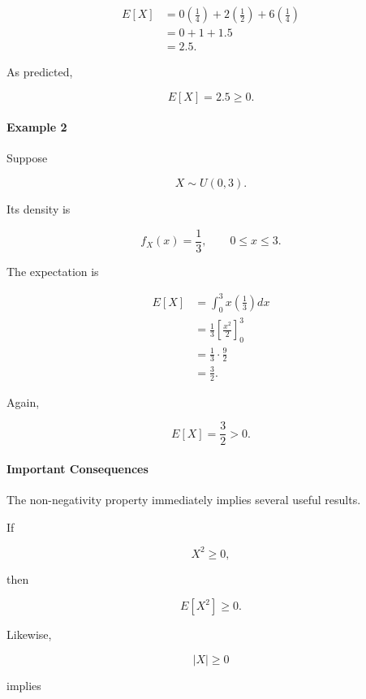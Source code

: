 \documentclass[11pt]{article}
\begin{document}
\begin{mdframed}[
		linewidth=0.8pt,
		roundcorner=6pt,
		backgroundcolor=gray!5,
		linecolor=gray!60,
		innertopmargin=10pt,
		innerbottommargin=10pt,
		innerleftmargin=10pt,
		innerrightmargin=10pt
		]
		\[
		\begin{aligned}
			E[X]
			&=
			0\left(\frac14\right)
			+
			2\left(\frac12\right)
			+
			6\left(\frac14\right)
			\\[0.3cm]
			&=
			0
			+
			1
			+
			1.5
			\\[0.3cm]
			&=
			2.5.
		\end{aligned}
		\]
		
		As predicted,
		
		\[
		\boxed{
			E[X]=2.5\ge0.
		}
		\]
		
		\bigskip
		
		\paragraph{Example 2}
		
		Suppose
		
		\[
		X\sim U(0,3).
		\]
		
		Its density is
		
		\[
		f_X(x)=
		\frac13,
		\qquad
		0\le x\le3.
		\]
		
		The expectation is
		
		\[
		\begin{aligned}
			E[X]
			&=
			\int_0^3
			x
			\left(\frac13\right)
			dx
			\\[0.3cm]
			&=
			\frac13
			\left[
			\frac{x^2}{2}
			\right]_0^3
			\\[0.3cm]
			&=
			\frac13
			\cdot
			\frac92
			\\[0.3cm]
			&=
			\frac32.
		\end{aligned}
		\]
		
		Again,
		
		\[
		\boxed{
			E[X]=\frac32>0.
		}
		\]
		
		\bigskip
		
		\paragraph{Important Consequences}
		
		The non-negativity property immediately implies several useful results.
		
		If
		
		\[
		X^2\ge0,
		\]
		
		then
		
		\[
		\boxed{
			E[X^2]\ge0.
		}
		\]
		
		Likewise,
		
		\[
		|X|\ge0
		\]
		
		implies
		

\end{mdframed}
\end{document}
